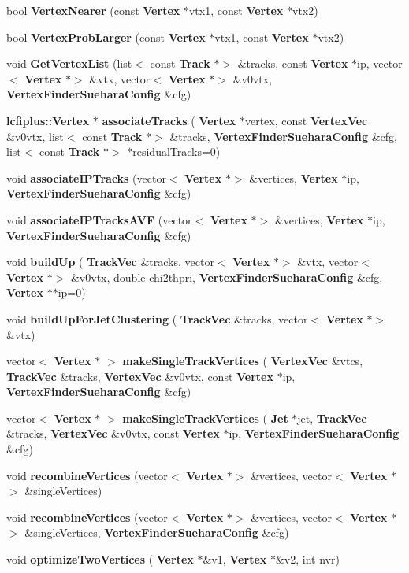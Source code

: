 \begin{DoxyCompactItemize}
\item 
bool \textbf{ Vertex\+Nearer} (const \textbf{ Vertex} $\ast$vtx1, const \textbf{ Vertex} $\ast$vtx2)
\item 
bool \textbf{ Vertex\+Prob\+Larger} (const \textbf{ Vertex} $\ast$vtx1, const \textbf{ Vertex} $\ast$vtx2)
\item 
void \textbf{ Get\+Vertex\+List} (list$<$ const \textbf{ Track} $\ast$$>$ \&tracks, const \textbf{ Vertex} $\ast$ip, vector$<$ \textbf{ Vertex} $\ast$$>$ \&vtx, vector$<$ \textbf{ Vertex} $\ast$$>$ \&v0vtx, \textbf{ Vertex\+Finder\+Suehara\+Config} \&cfg)
\item 
\textbf{ lcfiplus\+::\+Vertex} $\ast$ \textbf{ associate\+Tracks} (\textbf{ Vertex} $\ast$vertex, const \textbf{ Vertex\+Vec} \&v0vtx, list$<$ const \textbf{ Track} $\ast$$>$ \&tracks, \textbf{ Vertex\+Finder\+Suehara\+Config} \&cfg, list$<$ const \textbf{ Track} $\ast$$>$ $\ast$residual\+Tracks=0)
\item 
void \textbf{ associate\+I\+P\+Tracks} (vector$<$ \textbf{ Vertex} $\ast$$>$ \&vertices, \textbf{ Vertex} $\ast$ip, \textbf{ Vertex\+Finder\+Suehara\+Config} \&cfg)
\item 
void \textbf{ associate\+I\+P\+Tracks\+A\+VF} (vector$<$ \textbf{ Vertex} $\ast$$>$ \&vertices, \textbf{ Vertex} $\ast$ip, \textbf{ Vertex\+Finder\+Suehara\+Config} \&cfg)
\item 
void \textbf{ build\+Up} (\textbf{ Track\+Vec} \&tracks, vector$<$ \textbf{ Vertex} $\ast$$>$ \&vtx, vector$<$ \textbf{ Vertex} $\ast$$>$ \&v0vtx, double chi2thpri, \textbf{ Vertex\+Finder\+Suehara\+Config} \&cfg, \textbf{ Vertex} $\ast$$\ast$ip=0)
\item 
void \textbf{ build\+Up\+For\+Jet\+Clustering} (\textbf{ Track\+Vec} \&tracks, vector$<$ \textbf{ Vertex} $\ast$$>$ \&vtx)
\item 
vector$<$ \textbf{ Vertex} $\ast$ $>$ \textbf{ make\+Single\+Track\+Vertices} (\textbf{ Vertex\+Vec} \&vtcs, \textbf{ Track\+Vec} \&tracks, \textbf{ Vertex\+Vec} \&v0vtx, const \textbf{ Vertex} $\ast$ip, \textbf{ Vertex\+Finder\+Suehara\+Config} \&cfg)
\item 
vector$<$ \textbf{ Vertex} $\ast$ $>$ \textbf{ make\+Single\+Track\+Vertices} (\textbf{ Jet} $\ast$jet, \textbf{ Track\+Vec} \&tracks, \textbf{ Vertex\+Vec} \&v0vtx, const \textbf{ Vertex} $\ast$ip, \textbf{ Vertex\+Finder\+Suehara\+Config} \&cfg)
\item 
void \textbf{ recombine\+Vertices} (vector$<$ \textbf{ Vertex} $\ast$$>$ \&vertices, vector$<$ \textbf{ Vertex} $\ast$$>$ \&single\+Vertices)
\item 
void \textbf{ recombine\+Vertices} (vector$<$ \textbf{ Vertex} $\ast$$>$ \&vertices, vector$<$ \textbf{ Vertex} $\ast$$>$ \&single\+Vertices, \textbf{ Vertex\+Finder\+Suehara\+Config} \&cfg)
\item 
void \textbf{ optimize\+Two\+Vertices} (\textbf{ Vertex} $\ast$\&v1, \textbf{ Vertex} $\ast$\&v2, int nvr)
\end{DoxyCompactItemize}


